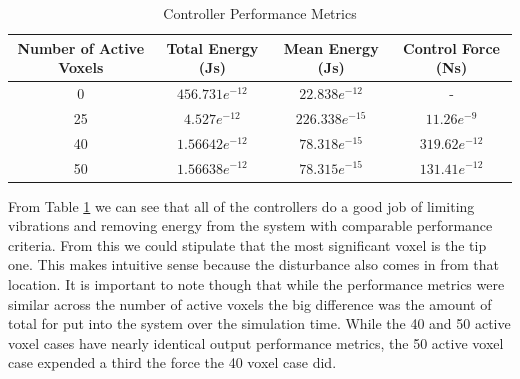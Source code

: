 \documentclass[11pt]{ucthesis}
\begin{document}
\begin{table}[h]
\caption{Controller Performance Metrics}
\label{tab:energy}
\begin{center}
\begin{tabular}{|c||c||c||c|}
\hline
Number of Active Voxels&Total Energy (Js)&Mean Energy (Js)&Control Force (Ns)\\
\hline
0 &$456.731e^{-12}$&$22.838e^{-12}$&-\\
\hline
25&$4.527e^{-12}$&$226.338e^{-15}$&$11.26e^{-9}$\\
\hline
40&$1.56642e^{-12}$&$78.318e^{-15}$&$319.62e^{-12}$\\
\hline
50&$1.56638e^{-12}$&$78.315e^{-15}$&$131.41e^{-12}$\\
\hline
\end{tabular}
\end{center}
\end{table}

From Table \ref{tab:energy} we can see that all of the controllers do a good job of limiting vibrations and removing energy from the system with comparable performance criteria. From this we could stipulate that the most significant voxel is the tip one. This makes intuitive sense because the disturbance also comes in from that location. It is important to note though that while the performance metrics were similar across the number of active voxels the big difference was the amount of total for put into the system over the simulation time. While the 40 and 50 active voxel cases have nearly identical output performance metrics, the 50 active voxel case expended a third the force the 40 voxel case did.
\end{document}
